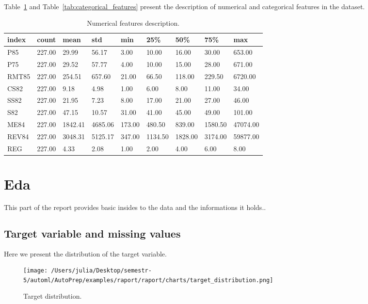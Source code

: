 \documentclass{article}%
\begin{document}
%
Table~\ref{tab:numerical_features} %
and %
Table~\ref{tab:categorical_features} %
present the description of numerical and categorical features in the dataset.%


\begin{table}[H]%
\begin{center}%
\renewcommand{\arraystretch}{1.5}%
\begin{tabular}{l l l l l l l l l}%
\hline%
\textbf{index}&\textbf{count}&\textbf{mean}&\textbf{std}&\textbf{min}&\textbf{25\%}&\textbf{50\%}&\textbf{75\%}&\textbf{max}\\%
\hline%
P85&227.00&29.99&56.17&3.00&10.00&16.00&30.00&653.00\\%
P75&227.00&29.52&57.77&4.00&10.00&15.00&28.00&671.00\\%
RMT85&227.00&254.51&657.60&21.00&66.50&118.00&229.50&6720.00\\%
CS82&227.00&9.18&4.98&1.00&6.00&8.00&11.00&34.00\\%
SS82&227.00&21.95&7.23&8.00&17.00&21.00&27.00&46.00\\%
S82&227.00&47.15&10.57&31.00&41.00&45.00&49.00&101.00\\%
ME84&227.00&1842.41&4685.06&173.00&480.50&839.00&1580.50&47074.00\\%
REV84&227.00&3048.31&5125.17&347.00&1134.50&1828.00&3174.00&59877.00\\%
REG&227.00&4.33&2.08&1.00&2.00&4.00&6.00&8.00\\%
\hline%
\end{tabular}%
\end{center}%
\caption{Numerical features description.}%
\label{tab:numerical_features}%
\end{table}

%
\section{Eda}%
\label{sec:Eda}%

%
This part of the report provides basic insides to the data and the informations it holds..%
\subsection{Target variable and missing values}%
\label{subsec:Targetvariableandmissingvalues}%

%
Here we present the distribution of the target variable.%


\begin{figure}[H]%
\centering%
\texttt{[image: /Users/julia/Desktop/semestr-5/automl/AutoPrep/examples/raport/raport/charts/target\_distribution.png]}%
\caption{Target distribution.}%
\end{figure}
\end{document}
